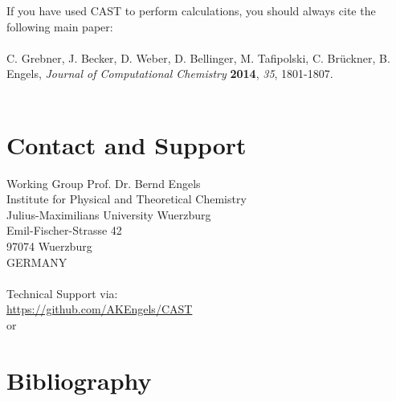 \documentclass[10pt,a4paper]{article} %
\begin{document}
	If you have used \ac{CAST} to perform calculations, you should always cite the following main paper:\\~\\
	C. Grebner, J. Becker, D. Weber, D. Bellinger, M. Tafipolski, C. Br\"uckner,
	B. Engels, \textit{Journal of Computational Chemistry} \textbf{2014}, \textit{35}, 1801-1807.~\\~\\
	

	\newpage
	\section{Contact and Support}
	\label{sec:contact}

	Working Group Prof. Dr. Bernd Engels\\
	Institute for Physical and Theoretical Chemistry\\
	Julius-Maximilians University Wuerzburg\\
	Emil-Fischer-Strasse 42\\
	97074 Wuerzburg\\
	GERMANY\\~\\
	Technical Support via:\\
	\url{https://github.com/AKEngels/CAST}\\
	or\\

\newpage
\section{Bibliography}
\printbibliography
\end{document}

